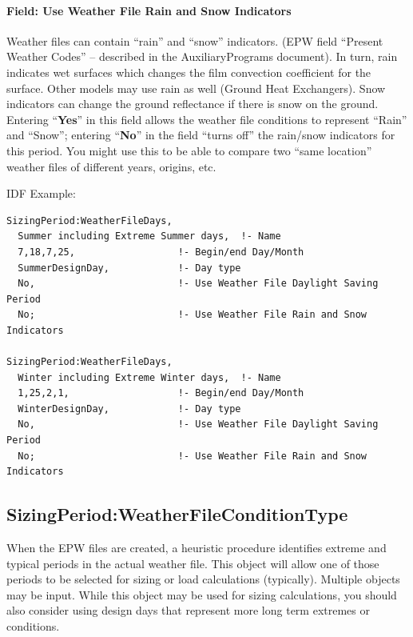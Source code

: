 \paragraph{Field: Use Weather File Rain and Snow Indicators}\label{field-use-weather-file-rain-and-snow-indicators}

Weather files can contain ``rain'' and ``snow'' indicators. (EPW field ``Present Weather Codes'' -- described in the AuxiliaryPrograms document). In turn, rain indicates wet surfaces which changes the film convection coefficient for the surface. Other models may use rain as well (Ground Heat Exchangers). Snow indicators can change the ground reflectance if there is snow on the ground. Entering ``\textbf{Yes}'' in this field allows the weather file conditions to represent ``Rain'' and ``Snow''; entering ``\textbf{No}'' in the field ``turns off'' the rain/snow indicators for this period. You might use this to be able to compare two ``same location'' weather files of different years, origins, etc.

IDF Example:

\begin{lstlisting}
SizingPeriod:WeatherFileDays,
  Summer including Extreme Summer days,  !- Name
  7,18,7,25,                  !- Begin/end Day/Month
  SummerDesignDay,            !- Day type
  No,                         !- Use Weather File Daylight Saving Period
  No;                         !- Use Weather File Rain and Snow Indicators

SizingPeriod:WeatherFileDays,
  Winter including Extreme Winter days,  !- Name
  1,25,2,1,                   !- Begin/end Day/Month
  WinterDesignDay,            !- Day type
  No,                         !- Use Weather File Daylight Saving Period
  No;                         !- Use Weather File Rain and Snow Indicators
\end{lstlisting}

\subsection{Sizing\-Period:\-Weather\-File\-Con\-dition\-Type}\label{sizingperiodweatherfileconditiontype}

When the EPW files are created, a heuristic procedure identifies extreme and typical periods in the actual weather file. This object will allow one of those periods to be selected for sizing or load calculations (typically). Multiple objects may be input. While this object may be used for sizing calculations, you should also consider using design days that represent more long term extremes or conditions.

